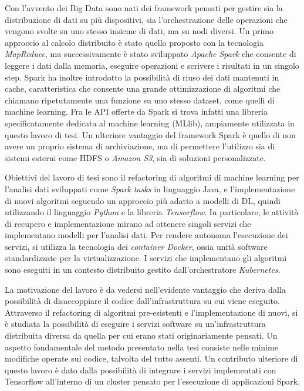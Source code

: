 \documentclass[11pt]{article}
\begin{document}
Con l'avvento dei Big Data sono nati dei framework pensati per gestire sia la distribuzione di dati su più dispositivi, sia l'orchestrazione delle operazioni che vengono svolte su uno stesso insieme di dati, ma su nodi diversi.
Un primo approccio al calcolo distribuito è stato quello proposto con la tecnologia \emph{MapReduce}, ma successivamente è stato sviluppato \emph{Apache Spark} che consente di leggere i dati dalla memoria, eseguire operazioni e scrivere i risultati in un singolo step. Spark ha inoltre introdotto la possibilità di riuso dei dati mantenuti in cache, caratteristica che consente una grande ottimizzazione di algoritmi che chiamano ripetutamente una funzione su uno stesso dataset, come quelli di machine learning. Fra le API offerte da Spark si trova infatti una libreria specificatamente dedicata al machine learning (MLlib), ampiamente utilizzata in questo lavoro di tesi. Un ulteriore vantaggio del framework Spark è quello di non avere un proprio sistema di archiviazione, ma di permettere l'utilizzo sia di sistemi esterni come HDFS o \emph{Amazon S3}, sia di soluzioni personalizzate.

Obiettivi del lavoro di tesi sono il refactoring di algoritmi di machine learning per l’analisi dati sviluppati come \emph{Spark tasks} in linguaggio Java, e l’implementazione di nuovi algoritmi seguendo un approccio più adatto a modelli di DL, quindi utilizzando il linguaggio \emph{Python} e la libreria \emph{Tensorflow}. In particolare, le attività di recupero e implementazione mirano ad ottenere singoli servizi che implementano modelli per l'analisi dati. Per rendere autonoma l'esecuzione dei servizi, si utilizza la tecnologia dei \emph{container Docker}, ossia unità software standardizzate per la virtualizzazione. I servizi che implementano gli algoritmi sono eseguiti in un contesto distribuito gestito dall'orchestratore \emph{Kubernetes}.

La motivazione del lavoro è da vedersi nell'evidente vantaggio che deriva dalla possibilità di disaccoppiare il codice dall'infrastruttura su cui viene eseguito. Attraverso il refactoring di algoritmi pre-esistenti e l'implementazione di nuovi, si è studiata la possibilità di eseguire i servizi software su un'infrastruttura distribuita diversa da quella per cui erano stati originariamente pensati. Un aspetto fondamentale del metodo presentato nella tesi consiste nelle minime modifiche operate sul codice, talvolta del tutto assenti. Un contributo ulteriore di questo lavoro è dato dalla possibilità di integrare i servizi implementati con Tensorflow all'interno di un cluster pensato per l'esecuzione di applicazioni Spark.
\end{document}
